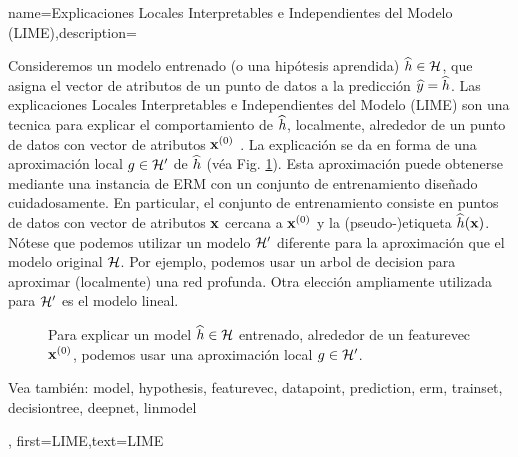 {name={Explicaciones Locales Interpretables e Independientes del Modelo (LIME)},description={
		Consideremos 
		un modelo entrenado (o una hipótesis aprendida) $\widehat{h} \in \mathcal{H}$, 
		que asigna el vector de atributos de un punto de datos a la predicción $\widehat{y}= \widehat{h}$. 
		Las explicaciones Locales Interpretables e Independientes del Modelo (LIME) son una tecnica para explicar 
		el comportamiento de $\widehat{h}$, localmente, alrededor de un punto de datos con vector de atributos ${\bf x}^{(0)}$ \cite{Ribeiro2016}. 
		La explicación se da en forma de una aproximación local $g \in \mathcal{H}'$ de $\widehat{h}$ (véa Fig. \ref{fig_lime_dict}). 
		Esta aproximación puede obtenerse mediante una instancia de ERM con un 
		conjunto de entrenamiento diseñado cuidadosamente. En particular, el conjunto de entrenamiento consiste en puntos de datos con 
		vector de atributos ${\bf x}$ cercana a ${\bf x}^{(0)}$ y la (pseudo-)etiqueta $\widehat{h}({\bf x})$. 
		Nótese que podemos utilizar un modelo $\mathcal{H}'$ diferente para la aproximación que 
		el modelo original $\mathcal{H}$. Por ejemplo, podemos usar un arbol de decision
		para aproximar (localmente) una red profunda. Otra elección ampliamente utilizada para $\mathcal{H}'$ es 
		el modelo lineal. 
		\begin{figure}[H]
		\begin{center}
		\end{center}
		\caption{Para explicar un \gls{model} $\widehat{h} \in \mathcal{H}$ entrenado, alrededor de un \gls{featurevec} ${\bf x}^{(0)}$, podemos usar una aproximación local $g \in \mathcal{H}'$. }
		\label{fig_lime_dict}
		\end{figure}
		Vea también: \gls{model}, \gls{hypothesis}, \gls{featurevec}, \gls{datapoint}, \gls{prediction}, \gls{erm}, \gls{trainset}, \gls{decisiontree}, \gls{deepnet}, \gls{linmodel}  },
	first={LIME},text={LIME}
}




